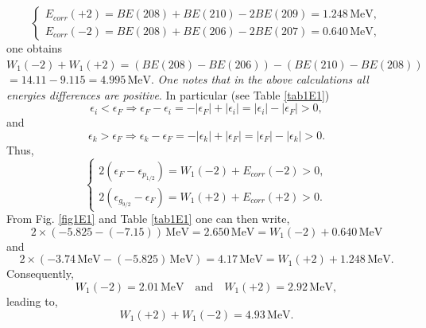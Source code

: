 \begin{equation}\label{eq3.5.2}
 \left\{
 \begin{array}{c}
  E_{corr}(+2)=BE(208)+BE(210)-2BE(209)=1.248\,\text{MeV},\\ 
  E_{corr}(-2)=BE(208)+BE(206)-2BE(207)=0.640\,\text{MeV},
 \end{array}
 \right.
 \end{equation}
 one obtains
 $W_1(-2)+W_1(+2)=(BE(208)-BE(206))-(BE(210)-BE(208))$
 $=14.11-9.115=4.995 \,\text{MeV}$. \textit{One notes that in the above calculations all energies differences are positive}. In particular (see Table \ref{tab1E1})  
\begin{equation*}
\epsilon_i<\epsilon_F\Rightarrow \epsilon_F-\epsilon_i=-|\epsilon_F|+|\epsilon_i|=|\epsilon_i|-|\epsilon_F|>0,
\end{equation*}
and
\begin{equation*}
\epsilon_k>\epsilon_F\Rightarrow \epsilon_k-\epsilon_F=-|\epsilon_k|+|\epsilon_F|=|\epsilon_F|-|\epsilon_k|>0.
\end{equation*}
Thus,
\begin{equation*}
\left\{
\begin{array}{c}
 2(\epsilon_F-\epsilon_{p_{1/2}})=W_1(-2)+E_{corr}(-2)>0,\\ 
 2(\epsilon_{g_{9/2}}-\epsilon_F)=W_1(+2)+E_{corr}(+2)>0.
\end{array}
\right.
\end{equation*}
From Fig. \ref{fig1E1} and Table \ref{tab1E1} one can then write,
\begin{equation*} 
2\times(-5.825-(-7.15))\,\text{MeV}=2.650\,\text{MeV}=W_1(-2)+0.640\,\text{MeV}
\end{equation*}
and 
\begin{equation*} 
2\times(-3.74\, \text{MeV}-(-5.825)\,\text{MeV})=4.17\, \text{MeV}=W_1(+2)+1.248\, \text{MeV}.
\end{equation*}
Consequently,
\begin{equation*} 
W_1(-2)=2.01\,\text{MeV}\quad \text{and} \quad W_1(+2)=2.92\,\text{MeV},
\end{equation*}
leading to,
\begin{equation}\label{eq2.5.1} 
W_1(+2)+W_1(-2)=4.93\,\text{MeV}.
\end{equation}

